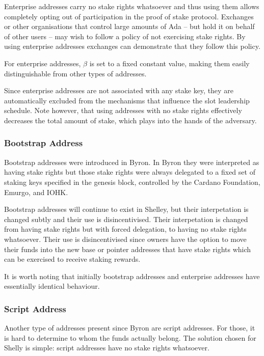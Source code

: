 \documentclass[11pt,a4paper]{article}
\begin{document}
Enterprise addresses carry no stake rights whatsoever and thus using
them allows completely opting out of participation in the proof of stake
protocol. Exchanges or other organisations that control large amounts of
Ada -- but hold it on behalf of other users -- may wish to follow a
policy of not exercising stake rights. By using enterprise addresses
exchanges can demonstrate that they follow this policy.

For enterprise addresses, \(\beta\) is set to a fixed constant value,
making them easily distinguishable from other types of addresses.

Since enterprise addresses are not associated with any stake key, they
are automatically excluded from the mechanisms that influence the slot
leadership schedule. Note however, that using addresses with no stake
rights effectively decreases the total amount of stake, which plays into
the hands of the adversary.

\subsubsection{Bootstrap Address}\label{bootstrap-address}

Bootstrap addresses were introduced in Byron. In Byron they were
interpreted as having stake rights but those stake rights were always
delegated to a fixed set of staking keys specified in the genesis block,
controlled by the Cardano Foundation, Emurgo, and IOHK.

Bootstrap addresses will continue to exist in Shelley, but their
interpetation is changed subtly and their use is disincentivised. Their
interpetation is changed from having stake rights but with forced
delegation, to having no stake rights whatsoever. Their use is
disincentivised since owners have the option to move their funds into
the new base or pointer addresses that have stake rights which can be
exercised to receive staking rewards.

It is worth noting that initially bootstrap addresses and enterprise
addresses have essentially identical behaviour.

\subsubsection{Script Address}\label{script-address}

Another type of addresses present since Byron are script addresses. For
those, it is hard to determine to whom the funds actually belong. The
solution chosen for Shelly is simple: script addresses have no stake
rights whatsoever.
\end{document}
